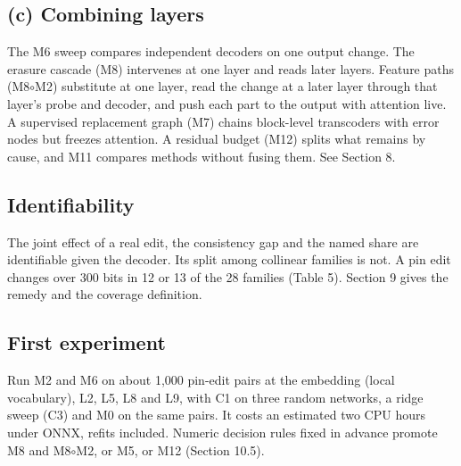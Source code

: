 \documentclass[conference]{IEEEtran}
\begin{document}
\subsection{(c) Combining layers}\label{sec:2.3}
The M6 sweep compares independent decoders on one output change. The erasure cascade (M8) intervenes at one layer and reads later layers. Feature paths (M8$\circ$M2) substitute at one layer, read the change at a later layer through that layer's probe and decoder, and push each part to the output with attention live. A supervised replacement graph (M7) chains block-level transcoders with error nodes but freezes attention. A residual budget (M12) splits what remains by cause, and M11 compares methods without fusing them. See Section 8.

\subsection{Identifiability}\label{sec:2.4}
The joint effect of a real edit, the consistency gap and the named share are identifiable given the decoder. Its split among collinear families is not. A pin edit changes over 300 bits in 12 or 13 of the 28 families (Table 5). Section 9 gives the remedy and the coverage definition.

\subsection{First experiment}\label{sec:2.5}
Run M2 and M6 on about 1,000 pin-edit pairs at the embedding (local vocabulary), L2, L5, L8 and L9, with C1 on three random networks, a ridge sweep (C3) and M0 on the same pairs. It costs an estimated two CPU hours under ONNX, refits included. Numeric decision rules fixed in advance promote M8 and M8$\circ$M2, or M5, or M12 (Section 10.5).
\end{document}
